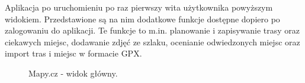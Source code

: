 Aplikacja po uruchomieniu po raz pierwszy wita użytkownika powyższym widokiem. Przedstawione są na nim dodatkowe funkcje dostępne dopiero po zalogowaniu do aplikacji. Te funkcje to m.in. planowanie i zapisywanie trasy oraz ciekawych miejsc, dodawanie zdjęć ze szlaku, ocenianie odwiedzonych miejsc oraz import tras i miejsc w formacie GPX. 
\begin{figure}[H]
    \centering
    \caption{Mapy.cz - widok główny.}
    \label{mapycz:glowna}
\end{figure}
